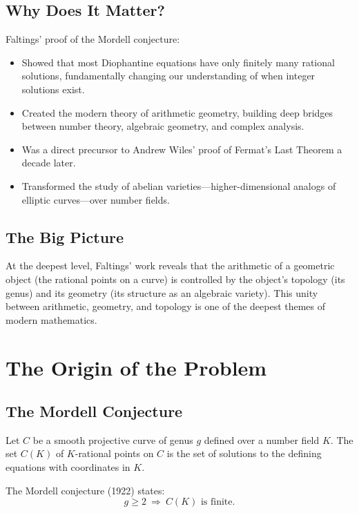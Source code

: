 \subsection{Why Does It Matter?}

Faltings' proof of the Mordell conjecture:
\begin{itemize}
\item Showed that most Diophantine equations have only finitely many rational solutions, fundamentally changing our understanding of when integer solutions exist.
\item Created the modern theory of arithmetic geometry, building deep bridges between number theory, algebraic geometry, and complex analysis.
\item Was a direct precursor to Andrew Wiles' proof of Fermat's Last Theorem a decade later.
\item Transformed the study of abelian varieties---higher-dimensional analogs of elliptic curves---over number fields.
\end{itemize}

\subsection{The Big Picture}

At the deepest level, Faltings' work reveals that the arithmetic of a geometric object (the rational points on a curve) is controlled by the object's topology (its genus) and its geometry (its structure as an algebraic variety). This unity between arithmetic, geometry, and topology is one of the deepest themes of modern mathematics.

\section{The Origin of the Problem}

\subsection{The Mordell Conjecture}

Let $C$ be a smooth projective curve of genus $g$ defined over a number field $K$. The set $C(K)$ of $K$-rational points on $C$ is the set of solutions to the defining equations with coordinates in $K$.

The Mordell conjecture (1922) states:
\[
g \geq 2 \ \Longrightarrow\ C(K) \text{ is finite}.
\]

